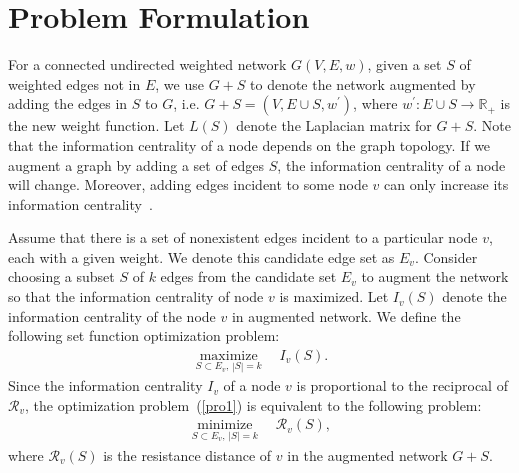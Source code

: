 \documentclass{article}
\def\kh#1{\left( #1 \right)}
\newcommand{\rea}{\mathbb{R}}
\newcommand\LL{\bm{\mathit{L}}}
\def\trace#1{\mathrm{Tr} \left(#1 \right)}
\def\sizeof#1{\left|#1  \right|}
\newtheorem{lemma}[theo]{Lemma}
\begin{document}

\section{Problem Formulation}

For a connected undirected weighted network $G(V,E,w)$, given a set $S$ of weighted edges not in $E$, we use $G+S$ to denote the network augmented by adding the edges in $S$ to $G$, i.e. $G+S = (V,E\cup S, w^\prime)$, where $w^\prime: E\cup S \to \rea_{+}$ is the new weight function. Let $\LL(S)$ denote the Laplacian matrix for $G+S$. Note that the information centrality of a node depends on the graph topology.
If we augment a graph by adding a set of edges $S$,  the information centrality of a node will change. Moreover, adding edges incident to some node $v$ can only increase its information centrality~\cite{DoSn84}. \par

Assume that there is a set of nonexistent edges incident to a particular node $v$, each with a given weight. We denote this candidate edge set as $E_v$.
Consider choosing a subset $S$ of $k$ edges from the candidate set $E_v$ to augment the network so that the information centrality of  node $v$ is maximized. Let $I_v(S)$ denote the information centrality of the node $v$ in augmented network. We define the following set function optimization problem:
\begin{align}\label{pro1}
\underset{S\subset E_v,\, \sizeof{S}=k}{\operatorname{maximize}} \quad I_v(S).
\end{align}
Since the information centrality $I_v$ of a node $v$ is proportional to the reciprocal of $\mathcal{R}_v$, the optimization problem~(\ref{pro1}) is equivalent to  the following  problem:
\begin{align}\label{pro}
	\underset{S\subset E_v,\, \sizeof{S}=k}{\operatorname{minimize}} \quad \mathcal{R}_v(S),
\end{align}
where $\mathcal{R}_v(S)$ is the  resistance distance of $v$  in the augmented network $G+S$. \par 
\end{document}
